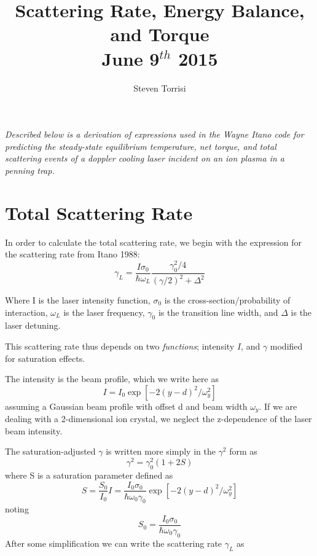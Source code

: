 \documentclass[11pt, oneside,reqno]{amsart}   	%
\title{ Scattering Rate, Energy Balance, and Torque \\ June 9$^{th}$ 2015}
\author{Steven Torrisi }
\newcommand{\eqn}[1]{\begin{equation}#1 \end{equation}}
\begin{document}
\maketitle
\emph{Described below is a derivation of expressions used in the Wayne Itano code for predicting the steady-state equilibrium temperature, net torque, and total scattering events of a doppler cooling laser incident on an ion plasma in a penning trap.}
%
%
%
%
%
%
%
%
%

\section{Total Scattering Rate}

In order to calculate the total scattering rate, we begin with the expression for the scattering rate from Itano 1988:
\eqn{\gamma_L = \frac{I \sigma_0}{\hbar \omega_L} \frac{\gamma_0^2/4}{(\gamma/2)^2 + \Delta^2}}

Where I is the laser intensity function, $\sigma_0$ is the cross-section/probability of interaction, $\omega_L$ is the laser frequency, $\gamma_0$ is the transition line width, and $\Delta$ is the laser detuning.

This scattering rate thus depends on two \emph{functions}; intensity $I$, and $\gamma$ modified for saturation effects.

The intensity is the beam profile, which we write here as 
\eqn{ I= I_0 \exp[ -2(y-d)^2/\omega_y^2]}
assuming a Gaussian beam profile with offset d and beam width $\omega_y$. If we are dealing with a 2-dimensional ion crystal, we neglect the z-dependence of the laser beam intensity.

The saturation-adjusted $\gamma$ is written more simply in the $\gamma^2$ form as  \eqn{ \gamma^2 = \gamma_0^2 (1+2S)}
where S is a saturation parameter defined as
\eqn{S= \frac{S_0}{I_0} I = \frac{I_0 \sigma_0}{\hbar \omega_0 \gamma_0}  \exp[ -2(y-d)^2/\omega_y^2]}
noting \eqn{S_0 =  \frac{I_0 \sigma_0}{\hbar \omega_0 \gamma_0} }
After some simplification we can write the scattering rate $\gamma_L$ as
\end{document}
